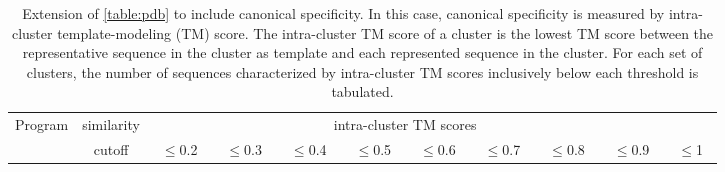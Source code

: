 \documentclass[11pt,letterpaper]{llncs2e/llncs}
\begin{document}
\clearpage{}

\begin{table}[t]%
	\centering
	\caption{
		Extension of \cref{table:pdb} to include canonical specificity.
		In this case, canonical specificity is measured by intra-cluster template-modeling (TM) score.
		The intra-cluster TM score of a cluster is the lowest TM score between the representative sequence in the cluster as template and each represented sequence in the cluster.
		For each set of clusters, the number of sequences characterized by intra-cluster TM scores inclusively below each threshold is tabulated.
	}
	\begin{tabular}{l c c c c c c c c c c}
		\toprule
		Program & similarity & 
		\multicolumn{8}{c}{intra-cluster TM scores} \\
		& cutoff      & ~\(\le\)0.2~ &
		~\(\le\)0.3~ & ~\(\le\)0.4~ & ~\(\le\)0.5~ 
		& ~\(\le\)0.6~ & ~\(\le\)0.7~ & ~\(\le\)0.8~ & ~\(\le\)0.9~ & ~\(\le\)1~ \\
		\midrule
		

\end{tabular}
\end{table}
\end{document}
